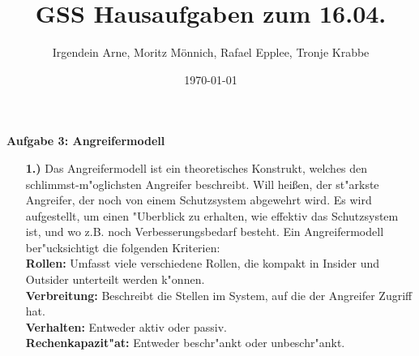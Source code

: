 \documentclass[a4paper,11pt]{scrartcl}
\author{Irgendein Arne, Moritz Mönnich, Rafael Epplee, Tronje Krabbe}
\title{GSS Hausaufgaben zum 16.04.}
\date{\today}
\begin{document}
    \maketitle
    \textbf{Aufgabe 3: Angreifermodell} \\
            \begin{enumerate}
                \item[\textbf{1.)}]
                    Das Angreifermodell ist ein theoretisches Konstrukt, welches den schlimmst-m"oglichsten Angreifer beschreibt.
                    Will heißen, der st"arkste Angreifer, der noch von einem Schutzsystem abgewehrt wird. Es wird aufgestellt,
                    um einen "Uberblick zu erhalten, wie effektiv das Schutzsystem ist, und wo z.B. noch Verbesserungsbedarf besteht.
                    Ein Angreifermodell ber"ucksichtigt die folgenden Kriterien: \\
                    \textbf{Rollen:} Umfasst viele verschiedene Rollen, die kompakt in Insider und Outsider unterteilt werden k"onnen.\\
                    \textbf{Verbreitung:} Beschreibt die Stellen im System, auf die der Angreifer Zugriff hat.\\
                    \textbf{Verhalten:} Entweder aktiv oder passiv.\\
                    \textbf{Rechenkapazit"at:} Entweder beschr"ankt oder unbeschr"ankt.
            \end{enumerate}
\end{document}
